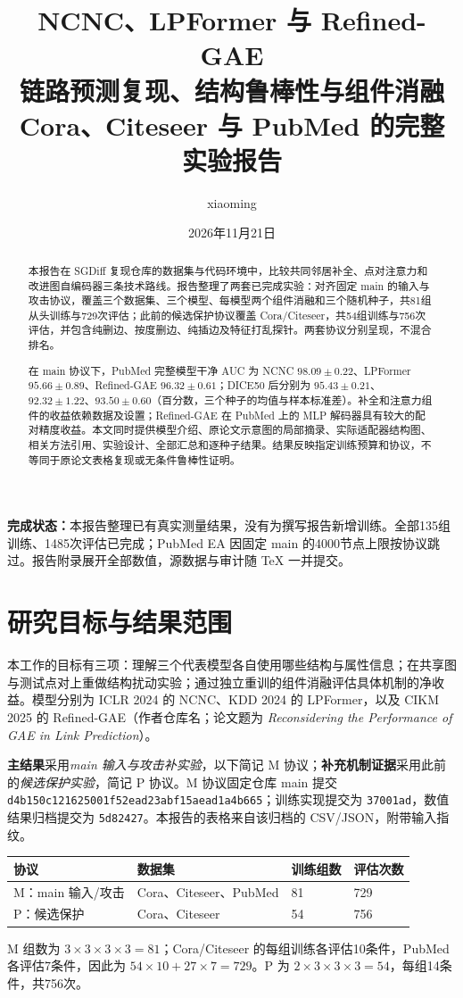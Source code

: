 \documentclass[UTF8,a4paper,11pt,fontset=fandol]{ctexart}
\title{\textbf{NCNC、LPFormer 与 Refined-GAE}\\链路预测复现、结构鲁棒性与组件消融\\\large Cora、Citeseer 与 PubMed 的完整实验报告}
\author{xiaoming}\date{2026年11月21日}
\newcommand{\code}[1]{{\small\nolinkurl{#1}}}
\begin{document}
\maketitle
\begin{abstract}
本报告在 SGDiff 复现仓库的数据集与代码环境中，比较共同邻居补全、点对注意力和改进图自编码器三条技术路线。报告整理了两套已完成实验：对齐固定 main 的输入与攻击协议，覆盖三个数据集、三个模型、每模型两个组件消融和三个随机种子，共81组从头训练与729次评估；此前的候选保护协议覆盖 Cora/Citeseer，共54组训练与756次评估，并包含纯删边、按度删边、纯插边及特征打乱探针。两套协议分别呈现，不混合排名。

在 main 协议下，PubMed 完整模型干净 AUC 为 NCNC $98.09\pm0.22$、LPFormer $95.66\pm0.89$、Refined-GAE $96.32\pm0.61$；DICE50 后分别为 $95.43\pm0.21$、$92.32\pm1.22$、$93.50\pm0.60$（百分数，三个种子的均值与样本标准差）。补全和注意力组件的收益依赖数据及设置；Refined-GAE 在 PubMed 上的 MLP 解码器具有较大的配对精度收益。本文同时提供模型介绍、原论文示意图的局部摘录、实际适配器结构图、相关方法引用、实验设计、全部汇总和逐种子结果。结果反映指定训练预算和协议，不等同于原论文表格复现或无条件鲁棒性证明。
\end{abstract}
\noindent\textbf{完成状态：}本报告整理已有真实测量结果，没有为撰写报告新增训练。全部135组训练、1485次评估已完成；PubMed EA 因固定 main 的4000节点上限按协议跳过。报告附录展开全部数值，源数据与审计随 TeX 一并提交。
\tableofcontents\clearpage
\section{研究目标与结果范围}
本工作的目标有三项：理解三个代表模型各自使用哪些结构与属性信息；在共享图与测试点对上重做结构扰动实验；通过独立重训的组件消融评估具体机制的净收益。模型分别为 ICLR 2024 的 NCNC、KDD 2024 的 LPFormer，以及 CIKM 2025 的 Refined-GAE（作者仓库名；论文题为 \emph{Reconsidering the Performance of GAE in Link Prediction}）\cite{wang2024ncnc,shomer2024lpformer,ma2025refined}。

\textbf{主结果}采用\emph{main 输入与攻击补实验}，以下简记 M 协议；\textbf{补充机制证据}采用此前的\emph{候选保护实验}，简记 P 协议。M 协议固定仓库 main 提交 \code{d4b150c121625001f52ead23abf15aead1a4b665}；训练实现提交为 \code{37001ad}，数值结果归档提交为 \code{5d82427}。本报告的表格来自该归档的 CSV/JSON，附带输入指纹。

\begin{center}\small
\begin{tabular}{llll}\toprule
协议&数据集&训练组数&评估次数\\\midrule
M：main 输入/攻击&Cora、Citeseer、PubMed&81&729\\
P：候选保护&Cora、Citeseer&54&756\\\bottomrule
\end{tabular}\end{center}
M 组数为 $3\times3\times3\times3=81$；Cora/Citeseer 的每组训练各评估10条件，PubMed 各评估7条件，因此为 $54\times10+27\times7=729$。P 为 $2\times3\times3\times3=54$，每组14条件，共756次。
\end{document}
